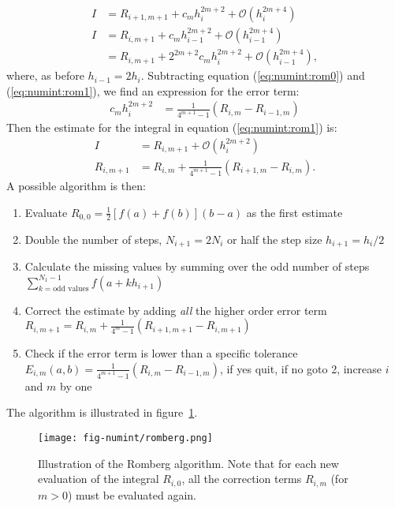 \documentclass[graybox,sectrefs,envcountresetchap,open=right,final]{svmonodo}
\begin{document}
\begin{align}
I&=R_{i+1,m+1}+c_mh_i^{2m+2}+\mathcal{O}(h_i^{2m+4})\label{eq:numint:rom0}\\ 
I&=R_{i,m+1}+c_mh_{i-1}^{2m+2}+\mathcal{O}(h_{i-1}^{2m+4})\nonumber\\ 
&=R_{i,m+1}+2^{2m+2}c_mh_{i}^{2m+2}+\mathcal{O}(h_{i-1}^{2m+4}),\label{eq:numint:rom1}
\end{align}
where, as before $h_{i-1}=2h_i$. Subtracting equation (\ref{eq:numint:rom0}) and (\ref{eq:numint:rom1}), we find an expression for the error term:
\begin{align}
c_mh_{i}^{2m+2}&=\frac{1}{4^{m+1}-1}(R_{i,m}-R_{i-1,m})\label{eq:numint:rom2}
\end{align}
Then the estimate for the integral in equation (\ref{eq:numint:rom1}) is:
\begin{align}
I&=R_{i,m+1}+\mathcal{O}(h_i^{2m+2})\\ 
R_{i,m+1}&=R_{i,m}+\frac{1}{4^{m+1}-1}(R_{i+1,m}-R_{i,m}).
\end{align}
A possible algorithm is then:

\begin{enumerate}
\item Evaluate $R_{0,0}=\frac{1}{2}\left[f(a)+f(b)\right](b-a)$ as the first estimate

\item Double the number of steps, $N_{i+1}=2N_i$ or half the step size $h_{i+1}=h_i/2$ 

\item Calculate the missing values by summing over the odd number of steps $\sum_{k=\text{odd values}}^{N_1-1}f(a+k h_{i+1})$

\item Correct the estimate by adding \emph{all} the higher order error term $R_{i,m+1}=R_{i,m}+\frac{1}{4^m-1}(R_{i+1,m+1}-R_{i,m+1})$

\item Check if the error term is lower than a specific tolerance $E_{i,m}(a,b)=\frac{1}{4^{m+1}-1}(R_{i,m}-R_{i-1,m})$, if yes quit, if no goto 2, increase $i$ and $m$ by one
\end{enumerate}

\noindent
The algorithm is illustrated in figure~\ref{fig:numint:romberg}.

\begin{figure}[!ht]  %
  \centerline{\texttt{[image: fig-numint/romberg.png]}}
  \caption{
  Illustration of the Romberg algorithm. Note that for each new evaluation of the integral $R_{i,0}$, all the correction terms $R_{i,m}$ (for $m>0$) must be evaluated again. \label{fig:numint:romberg}
  }
\end{figure}
\end{document}
